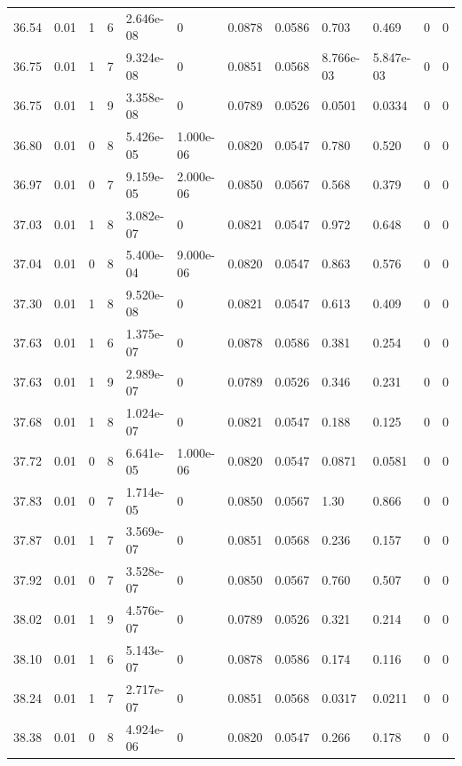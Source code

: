 \documentclass[preview]{standalone}
\begin{document}
{{{{{{{{{{\begin{tabular}{L{1.2cm}C{1.2cm} C{0.3cm}C{0.5cm} C{1.4cm}C{1.4cm} C{1.4cm}C{1.4cm} C{1.6cm}C{1.6cm} C{1.6cm}C{1.6cm}}
  36.54  &  0.01  & 1     &  6 &  2.646e-08  & 0  &  0.0878&   0.0586& 0.703 & 0.469   &  0 & 0  \\ 
  36.75  &  0.01  & 1     &  7 &  9.324e-08  & 0  &  0.0851&   0.0568& 8.766e-03 & 5.847e-03   &  0 & 0  \\ 
  36.75  &  0.01  & 1     &  9 &  3.358e-08  & 0  &  0.0789&   0.0526& 0.0501 & 0.0334   &  0 & 0  \\ 
  36.80  &  0.01  & 0     &  8 &  5.426e-05  & 1.000e-06  &  0.0820&   0.0547& 0.780 & 0.520   &  0 & 0  \\ 
  36.97  &  0.01  & 0     &  7 &  9.159e-05  & 2.000e-06  &  0.0850&   0.0567& 0.568 & 0.379   &  0 & 0  \\ 
  37.03  &  0.01  & 1     &  8 &  3.082e-07  & 0  &  0.0821&   0.0547& 0.972 & 0.648   &  0 & 0  \\ 
  37.04  &  0.01  & 0     &  8 &  5.400e-04  & 9.000e-06  &  0.0820&   0.0547& 0.863 & 0.576   &  0 & 0  \\ 
  37.30  &  0.01  & 1     &  8 &  9.520e-08  & 0  &  0.0821&   0.0547& 0.613 & 0.409   &  0 & 0  \\ 
  37.63  &  0.01  & 1     &  6 &  1.375e-07  & 0  &  0.0878&   0.0586& 0.381 & 0.254   &  0 & 0  \\ 
  37.63  &  0.01  & 1     &  9 &  2.989e-07  & 0  &  0.0789&   0.0526& 0.346 & 0.231   &  0 & 0  \\ 
  37.68  &  0.01  & 1     &  8 &  1.024e-07  & 0  &  0.0821&   0.0547& 0.188 & 0.125   &  0 & 0  \\ 
  37.72  &  0.01  & 0     &  8 &  6.641e-05  & 1.000e-06  &  0.0820&   0.0547& 0.0871 & 0.0581   &  0 & 0  \\ 
  37.83  &  0.01  & 0     &  7 &  1.714e-05  & 0  &  0.0850&   0.0567& 1.30 & 0.866   &  0 & 0  \\ 
  37.87  &  0.01  & 1     &  7 &  3.569e-07  & 0  &  0.0851&   0.0568& 0.236 & 0.157   &  0 & 0  \\ 
  37.92  &  0.01  & 0     &  7 &  3.528e-07  & 0  &  0.0850&   0.0567& 0.760 & 0.507   &  0 & 0  \\ 
  38.02  &  0.01  & 1     &  9 &  4.576e-07  & 0  &  0.0789&   0.0526& 0.321 & 0.214   &  0 & 0  \\ 
  38.10  &  0.01  & 1     &  6 &  5.143e-07  & 0  &  0.0878&   0.0586& 0.174 & 0.116   &  0 & 0  \\ 
  38.24  &  0.01  & 1     &  7 &  2.717e-07  & 0  &  0.0851&   0.0568& 0.0317 & 0.0211   &  0 & 0  \\ 
  38.38  &  0.01  & 0     &  8 &  4.924e-06  & 0  &  0.0820&   0.0547& 0.266 & 0.178   &  0 & 0  \\ 

\end{tabular}}}}}}}}}}}
\end{document}
